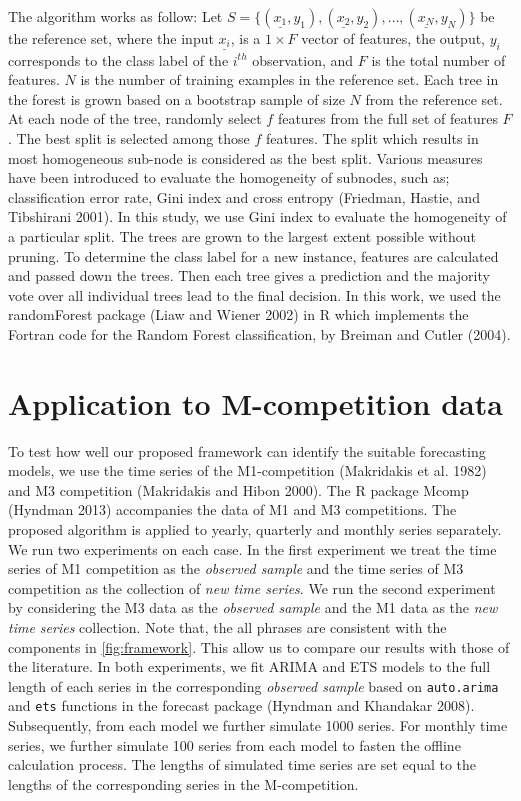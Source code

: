 \documentclass[11pt,]{article}
\theoremstyle{definition}
\theoremstyle{definition}
\theoremstyle{definition}
\theoremstyle{remark}
\begin{document}
The algorithm works as follow: Let
\(S=\{(\underline{x_1}, y_1), (\underline{x_2}, y_2), \dots, (\underline{x_N}, y_N)\}\)
be the reference set, where the input \(\underline{x_i}\), is a
\(1\times F\) vector of features, the output, \(y_i\) corresponds to the
class label of the \(i^{th}\) observation, and \(F\) is the total number
of features. \(N\) is the number of training examples in the reference
set. Each tree in the forest is grown based on a bootstrap sample of
size \(N\) from the reference set. At each node of the tree, randomly
select \(f\) features from the full set of features \(F\). The best
split is selected among those \(f\) features. The split which results in
most homogeneous sub-node is considered as the best split. Various
measures have been introduced to evaluate the homogeneity of subnodes,
such as; classification error rate, Gini index and cross entropy
(Friedman, Hastie, and Tibshirani 2001). In this study, we use Gini
index to evaluate the homogeneity of a particular split. The trees are
grown to the largest extent possible without pruning. To determine the
class label for a new instance, features are calculated and passed down
the trees. Then each tree gives a prediction and the majority vote over
all individual trees lead to the final decision. In this work, we used
the randomForest package (Liaw and Wiener 2002) in R which implements
the Fortran code for the Random Forest classification, by Breiman and
Cutler (2004).

\section{Application to M-competition
data}\label{application-to-m-competition-data}

To test how well our proposed framework can identify the suitable
forecasting models, we use the time series of the M1-competition
(Makridakis et al. 1982) and M3 competition (Makridakis and Hibon 2000).
The R package Mcomp (Hyndman 2013) accompanies the data of M1 and M3
competitions. The proposed algorithm is applied to yearly, quarterly and
monthly series separately. We run two experiments on each case. In the
first experiment we treat the time series of M1 competition as the
\emph{observed sample} and the time series of M3 competition as the
collection of \emph{new time series}. We run the second experiment by
considering the M3 data as the \emph{observed sample} and the M1 data as
the \emph{new time series} collection. Note that, the all phrases are
consistent with the components in \autoref{fig:framework}. This allow us
to compare our results with those of the literature. In both
experiments, we fit ARIMA and ETS models to the full length of each
series in the corresponding \emph{observed sample} based on
\texttt{auto.arima} and \texttt{ets} functions in the forecast package
(Hyndman and Khandakar 2008). Subsequently, from each model we further
simulate 1000 series. For monthly time series, we further simulate 100
series from each model to fasten the offline calculation process. The
lengths of simulated time series are set equal to the lengths of the
corresponding series in the M-competition.
\end{document}
